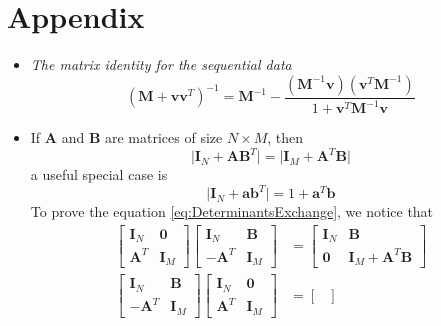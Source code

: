 \documentclass[12pt, a4paper]{article}
\begin{document}
    \section{Appendix}
    \begin{itemize}
        \item \textit{The matrix identity for the sequential data}
        \begin{equation}
            \label{eq:MIforSD}
            (\bm{M}+\bm{v}\bm{v}^T)^{-1}=\bm{M}^{-1}-\frac{(\bm{M}^{-1}\bm{v})(\bm{v}^T\bm{M}^{-1})}
            {1+\bm{v}^T\bm{M}^{-1}\bm{v}}
        \end{equation}
        \item If $\bm{A}$ and $\bm{B}$ are matrices of size $N\times M$, then
        \begin{equation}
            \label{eq:DeterminantsExchange}
            \vert\bm{I}_N+\bm{A}\bm{B}^T\vert=\vert\bm{I}_M+\bm{A}^T\bm{B}\vert
        \end{equation}
        a useful special case is 
        \begin{equation*}
            \vert\bm{I}_N+\bm{a}\bm{b}^T\vert=1+\bm{a}^T\bm{b}
        \end{equation*}
        To prove the equation \ref{eq:DeterminantsExchange}, we notice that
        \begin{align*}
            \begin{bmatrix}
                \bm{I}_N & \bm{0} \\
                \bm{A}^T & \bm{I}_M
            \end{bmatrix}\begin{bmatrix}
                \bm{I}_N & \bm{B}\\
                -\bm{A}^T & \bm{I}_M
            \end{bmatrix}&=\begin{bmatrix}
                \bm{I}_N & \bm{B}\\
                \bm{0} & \bm{I}_M+\bm{A}^T\bm{B}
            \end{bmatrix}\\
            \begin{bmatrix}
                \bm{I}_N & \bm{B}\\
                -\bm{A}^T & \bm{I}_M
            \end{bmatrix}\begin{bmatrix}
                \bm{I}_N & \bm{0} \\
                \bm{A}^T & \bm{I}_M
            \end{bmatrix}&=\begin{bmatrix}

\end{bmatrix}
\end{align*}
\end{itemize}
\end{document}
